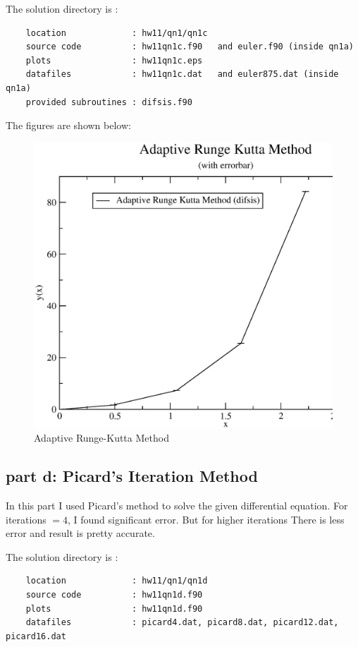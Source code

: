 \documentclass[11pt,a4paper,english]{article}
\begin{document}
		The solution directory is :\\
	\begin{verbatim}
	location             : hw11/qn1/qn1c
	source code          : hw11qn1c.f90   and euler.f90 (inside qn1a)
	plots                : hw11qn1c.eps
	datafiles            : hw11qn1c.dat   and euler875.dat (inside qn1a)
	provided subroutines : difsis.f90 
	\end{verbatim}
			    The figures are shown below:\\
	\begin{figure}[h!]
	\centering
	\includegraphics [scale=0.5]{figures/hw11qn1c.eps}
	\caption{Adaptive Runge-Kutta Method }
	\end{figure}
	\clearpage
	
	 
	\subsection{part d: Picard's Iteration Method}	
	In this part I used Picard's method to solve the given differential equation.
	For iterations $=4$, I found significant error. But for higher iterations
	There is less error and result is pretty accurate.
	
		The solution directory is :\\
	\begin{verbatim}
	location             : hw11/qn1/qn1d
	source code          : hw11qn1d.f90
	plots                : hw11qn1d.f90
	datafiles            : picard4.dat, picard8.dat, picard12.dat, picard16.dat 
	\end{verbatim}
	
\end{document}
